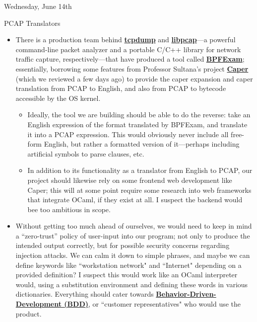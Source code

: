 \documentclass[11pt]{article}
\begin{document}
\begin{shininggoldbox}{Wednesday, June 14th\vspace{-2.2em}\begin{flushright}\large PCAP Translators \end{flushright}}
    \begin{itemize}         
        \item There is a production team behind \href{https://github.com/the-tcpdump-group/tcpdump/tree/master}{\textbf{tcpdump}} and \href{https://github.com/the-tcpdump-group/libpcap/tree/master}{\textbf{libpcap}}---a powerful command-line packet analyzer and a portable C/C++ library for network traffic capture, respectively---that have produced a tool called \href{https://www.tcpdump.org/bpfexam/}\textbf{BPFExam}; essentially, borrowing some features from Professor Sultana's project \href{https://gitlab.com/niksu/caper}{\textbf{Caper}} (which we reviewed a few days ago) to provide the caper expansion and caper translation from PCAP to English, and also from PCAP to bytecode accessible by the OS kernel.
        \vspace{-0.25em}
        \begin{itemize}
            \item Ideally, the tool we are building should be able to do the reverse: take an English expression of the format translated by BPFExam, and translate it into a PCAP expression. This would obviously never include all free-form English, but rather a formatted version of it---perhaps including artificial symbols to parse clauses, etc.
            \item In addition to its functionality as a translator from English to PCAP, our project should likewise rely on some frontend web development like Caper; this will at some point require some research into web frameworks that integrate OCaml, if they exist at all. I suspect the backend would bee too ambitious in scope.
        \end{itemize}
        \vspace{-0.5em}
        \item Without getting too much ahead of ourselves, we would need to keep in mind a ``zero-trust'' policy of user-input into our program; not only to produce the intended output correctly, but for possible security concerns regarding injection attacks. We can calm it down to simple phrases, and maybe we can define keywords like ``workstation network" and ``Internet" depending on a provided definition? I suspect this would work like an OCaml interpreter would, using a substitution environment and defining these words in various dictionaries. Everything should cater towards \href{https://en.wikipedia.org/wiki/Behavior-driven_development#Behavioral_specifications}{\textbf{Behavior-Driven-Development (BDD)}}, or ``customer representatives" who would use the product.
    \end{itemize}
\end{shininggoldbox}
\end{document}
